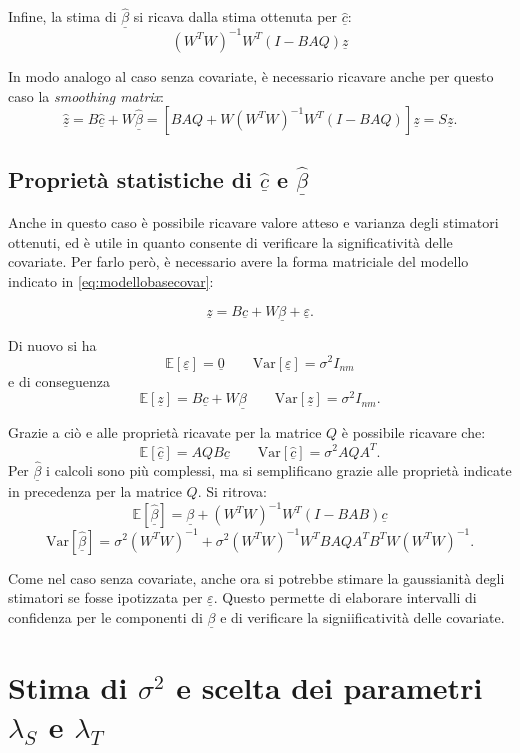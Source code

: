 \documentclass[a4paper,11pt,twoside,openright]{book}							%
\begin{document}
Infine, la stima di $\hat  {\underline \beta}$ si ricava dalla stima ottenuta per $\hat  {\underline c}$:
$$
(W^TW)^{-1}W^T(I-B AQ)\underline z
$$

In modo analogo al caso senza covariate, è necessario ricavare anche per questo caso la \textit{smoothing matrix}:
$$
\hat  {\underline z} =B\hat  {\underline c} + W \hat  {\underline \beta} = [B AQ + W(W^TW)^{-1}W^T(I-B AQ)]\underline z = S\underline z .
$$

\subsection*{Proprietà statistiche di $\hat  {\underline c}$ e $\hat  {\underline \beta}$}
Anche in questo caso è possibile ricavare valore atteso e varianza degli stimatori ottenuti, ed è utile in quanto consente di verificare la significatività delle covariate. Per farlo però, è necessario avere la forma matriciale del modello indicato in \ref{eq:modellobasecovar}:

\begin{equation}
\label{eq:modellobasecovarmatric}
\underline z=B \underline c + W \underline \beta + \underline \varepsilon .
\end{equation}

Di nuovo si ha 
$$
\mathbb{E}[\underline \varepsilon] = \underline 0 \qquad \mathrm{Var}[\underline \varepsilon] = \sigma^2 I_{nm}
$$
e di conseguenza
$$
\mathbb{E}[\underline z] = B \underline c + W \underline \beta \qquad \mathrm{Var}[\underline z] = \sigma^2 I_{nm} .
$$

Grazie a ciò e alle proprietà ricavate per la matrice $Q$ è possibile ricavare che:
$$
\mathbb{E}[\hat  {\underline c}] = AQB \underline c \qquad \mathrm{Var}[\hat  {\underline c}] = \sigma^2 AQA^T .
$$
Per $\hat  {\underline \beta}$ i calcoli sono più complessi, ma si semplificano grazie alle proprietà indicate in precedenza per la matrice $Q$. Si ritrova:
$$
\mathbb{E}[\hat  {\underline \beta}] = \underline \beta + (W^TW)^{-1}W^T(I-B AB)\underline c
$$
$$ \mathrm{Var}[\hat  {\underline \beta}] = \sigma^2 (W^TW)^{-1} + \sigma^2 (W^TW)^{-1}W^T B A Q A^T B^T W(W^TW)^{-1}.
$$

Come nel caso senza covariate, anche ora si potrebbe stimare la gaussianità degli stimatori se fosse ipotizzata per $\underline \varepsilon$. Questo permette di elaborare intervalli di confidenza per le componenti di $\underline \beta$ e di verificare la signiificatività delle covariate.


\section{Stima di $\sigma^2$ e scelta dei parametri $\lambda_S$ e $\lambda_T$}
\label{sez:GCV}
\end{document}
